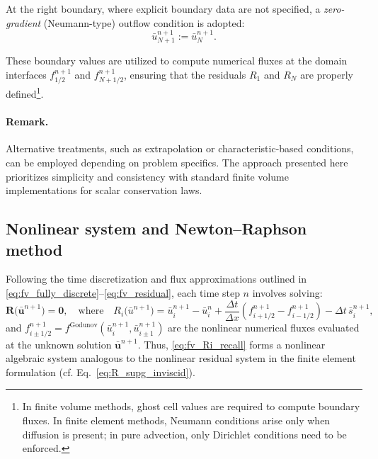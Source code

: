 At the right boundary, where explicit boundary data are not specified, a \textit{zero-gradient} (Neumann-type) outflow condition is adopted:
\begin{equation}\bar{u}_{N+1}^{n+1} := \bar{u}_N^{n+1}.\end{equation}

These boundary values are utilized to compute numerical fluxes at the domain interfaces \( f_{1/2}^{n+1} \) and \( f_{N+1/2}^{n+1} \), ensuring that the residuals \( R_1 \) and \( R_N \) are properly defined\footnote{In finite volume methods, ghost cell values are required to compute boundary fluxes. In finite element methods, Neumann conditions arise only when diffusion is present; in pure advection, only Dirichlet conditions need to be enforced.}.

\paragraph{Remark.} Alternative treatments, such as extrapolation or characteristic-based conditions, can be employed depending on problem specifics. The approach presented here prioritizes simplicity and consistency with standard finite volume implementations for scalar conservation laws.

\subsection{Nonlinear system and Newton--Raphson method}

Following the time discretization and flux approximations outlined in \eqref{eq:fv_fully_discrete}--\eqref{eq:fv_residual}, each time step \(n\) involves solving:
\begin{equation}
\mathbf{R}\bigl(\bar{\mathbf{u}}^{n+1}\bigr) = \mathbf{0},
\quad \text{where} \quad
R_i\bigl(\bar{u}^{n+1}\bigr)
=
\bar{u}_i^{n+1}
-
\bar{u}_i^n
+
\frac{\Delta t}{\Delta x}\left(
 f_{i+1/2}^{n+1} - f_{i-1/2}^{n+1}
\right)
-
\Delta t\,\bar{s}_i^{n+1},
\label{eq:fv_Ri_recall}
\end{equation}
and \(f_{i\pm1/2}^{n+1}=f^{\text{Godunov}}(\bar{u}_i^{n+1},\bar{u}_{i\pm1}^{n+1})\) are the nonlinear numerical fluxes evaluated at the unknown solution \(\bar{\mathbf{u}}^{n+1}\). Thus, \eqref{eq:fv_Ri_recall} forms a nonlinear algebraic system analogous to the nonlinear residual system in the finite element formulation (cf. Eq.~\eqref{eq:R_supg_inviscid}).

